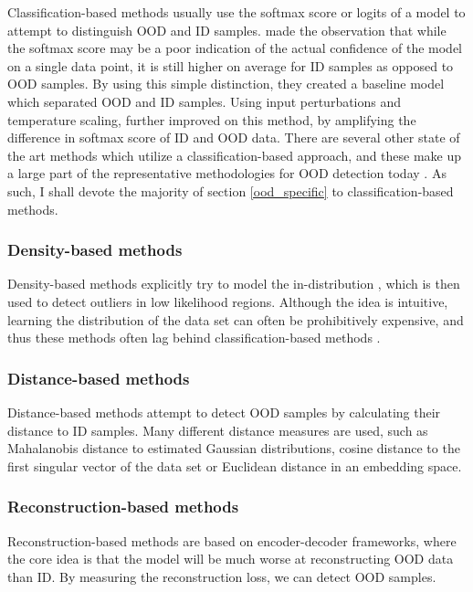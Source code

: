 \documentclass[conference,onecolumn]{IEEEtran}
\begin{document}
Classification-based methods usually use the softmax score or logits of a model to attempt to distinguish OOD and ID samples. \cite{oodbaseline} made the observation that while the softmax score may be a poor indication of the actual confidence of the model on a single data point, it is still higher on average for ID samples as opposed to OOD samples. By using this simple distinction, they created a baseline model which separated OOD and ID samples. Using input perturbations and temperature scaling, \cite{odin} further improved on this method, by amplifying the difference in softmax score of ID and OOD data. There are several other state of the art methods which utilize a classification-based approach, and these make up a large part of the representative methodologies for OOD detection today \cite[8]{oodoverview}. As such, I shall devote the majority of section \ref{ood_specific} to classification-based methods.
\\

\subsubsection{Density-based methods}

Density-based methods explicitly try to model the in-distribution \cite{oodoverview}, which is then used to detect outliers in low likelihood regions. Although the idea is intuitive, learning the distribution of the data set can often be prohibitively expensive, and thus these methods often lag behind classification-based methods \cite{oodoverview}.
\\

\subsubsection{Distance-based methods}

Distance-based methods attempt to detect OOD samples by calculating their distance to ID samples. Many different distance measures are used, such as Mahalanobis distance to estimated Gaussian distributions, cosine distance to the first singular vector of the data set or Euclidean distance in an embedding space.
\\

\subsubsection{Reconstruction-based methods}

Reconstruction-based methods are based on encoder-decoder frameworks, where the core idea is that the model will be much worse at reconstructing OOD data than ID. By measuring the reconstruction loss, we can detect OOD samples.
\\
\end{document}
